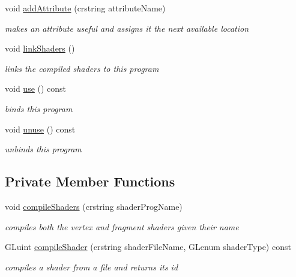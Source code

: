 \begin{DoxyCompactItemize}
void \hyperlink{classnta_1_1GLSLProgram_a708c47abebb9ca01b0eed4d1e711cef7}{add\+Attribute} (crstring attribute\+Name)
\begin{DoxyCompactList}\small\item\em makes an attribute useful and assigns it the next available location \end{DoxyCompactList}\item 
\mbox{\label{classnta_1_1GLSLProgram_aa1d946246f4b04ba0b947362152ec1c0}} 
void \hyperlink{classnta_1_1GLSLProgram_aa1d946246f4b04ba0b947362152ec1c0}{link\+Shaders} ()
\begin{DoxyCompactList}\small\item\em links the compiled shaders to this program \end{DoxyCompactList}\item 
\mbox{\label{classnta_1_1GLSLProgram_ac5c8fffb04aec82913b78e35db9ea31f}} 
void \hyperlink{classnta_1_1GLSLProgram_ac5c8fffb04aec82913b78e35db9ea31f}{use} () const
\begin{DoxyCompactList}\small\item\em binds this program \end{DoxyCompactList}\item 
\mbox{\label{classnta_1_1GLSLProgram_a3153b4281ab2b6fcf0017c90bbd199af}} 
void \hyperlink{classnta_1_1GLSLProgram_a3153b4281ab2b6fcf0017c90bbd199af}{unuse} () const
\begin{DoxyCompactList}\small\item\em unbinds this program \end{DoxyCompactList}\end{DoxyCompactItemize}
\subsection*{Private Member Functions}
\begin{DoxyCompactItemize}
\item 
\mbox{\label{classnta_1_1GLSLProgram_a6de85b6da0514bb9461268ff4806bed5}} 
void \hyperlink{classnta_1_1GLSLProgram_a6de85b6da0514bb9461268ff4806bed5}{compile\+Shaders} (crstring shader\+Prog\+Name)
\begin{DoxyCompactList}\small\item\em compiles both the vertex and fragment shaders given their name \end{DoxyCompactList}\item 
\mbox{\label{classnta_1_1GLSLProgram_a6ec17ca27433ffd2afa0f214fda7eb83}} 
G\+Luint \hyperlink{classnta_1_1GLSLProgram_a6ec17ca27433ffd2afa0f214fda7eb83}{compile\+Shader} (crstring shader\+File\+Name, G\+Lenum shader\+Type) const
\begin{DoxyCompactList}\small\item\em compiles a shader from a file and returns its id \end{DoxyCompactList}\end{DoxyCompactItemize}
